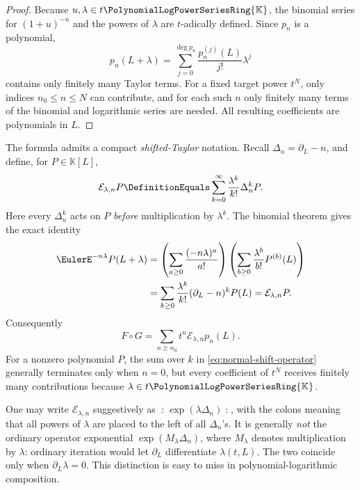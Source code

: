 \documentclass[11pt]{article}
\theoremstyle{pltheorem}
\newcommand{\K}{\mathbb K}
\newcommand{\PL}{\PolynomialLogPowerSeriesRing{\K}}
\newcommand{\compose}{\mathbin{\circ}}
\begin{document}
\begin{proof}
Because \(u,\lambda\in t\PL\), the binomial series for \((1+u)^{-n}\) and the powers of \(\lambda\) are \(t\)-adically defined.  Since \(p_n\) is a polynomial,
\begin{equation}\label{eq:polynomial-shift}
 p_n(L+\lambda)
 =\sum_{j=0}^{\deg p_n}\frac{p_n^{(j)}(L)}{j!}\lambda^j
\end{equation}
contains only finitely many Taylor terms.  For a fixed target power \(t^N\), only indices \(n_0\le n\le N\) can contribute, and for each such \(n\) only finitely many terms of the binomial and logarithmic series are needed.  All resulting coefficients are polynomials in \(L\).
\end{proof}

The formula admits a compact \emph{shifted-Taylor} notation.  Recall
\(\Delta_n=\partial_L-n\), and define, for \(P\in\K[L]\),
\begin{equation}\label{eq:normal-shift-operator}
 \mathcal E_{\lambda,n}P
 \DefinitionEquals\sum_{k=0}^{\infty}\frac{\lambda^k}{k!}\Delta_n^kP.
\end{equation}
Here every \(\Delta_n^k\) acts on \(P\) \emph{before} multiplication by
\(\lambda^k\).  The binomial theorem gives the exact identity
\begin{align}
 \EulerE^{-n\lambda}P(L+\lambda)
 &=\left(\sum_{a\ge0}\frac{(-n\lambda)^a}{a!}\right)
   \left(\sum_{b\ge0}\frac{\lambda^b}{b!}P^{(b)}(L)\right)\notag\\
 &=\sum_{k\ge0}\frac{\lambda^k}{k!}(\partial_L-n)^kP(L)
 =\mathcal E_{\lambda,n}P.\label{eq:shifted-Taylor-identity}
\end{align}
Consequently
\begin{equation}\label{eq:composition-operator-form}
 F\compose G
 =\sum_{n\ge n_0}t^n\mathcal E_{\lambda,n}p_n(L).
\end{equation}
For a nonzero polynomial \(P\), the sum over \(k\) in
\cref{eq:normal-shift-operator} generally terminates only when \(n=0\),
but every coefficient of \(t^N\) receives finitely many
contributions because \(\lambda\in t\PL\).

\begin{warningbox}
One may write \(\mathcal E_{\lambda,n}\) suggestively as
\(\mathopen{:}\!\exp(\lambda\Delta_n)\!\mathclose{:}\), with the colons
meaning that all powers of \(\lambda\) are placed to the left of all
\(\Delta_n\)'s.  It is generally \emph{not} the ordinary operator
exponential \(\exp(M_\lambda\Delta_n)\), where \(M_\lambda\) denotes
multiplication by \(\lambda\): ordinary iteration would let
\(\partial_L\) differentiate \(\lambda(t,L)\).  The two coincide only
when \(\partial_L\lambda=0\).  This distinction is easy to miss in
polynomial-logarithmic composition.
\end{warningbox}
\end{document}
